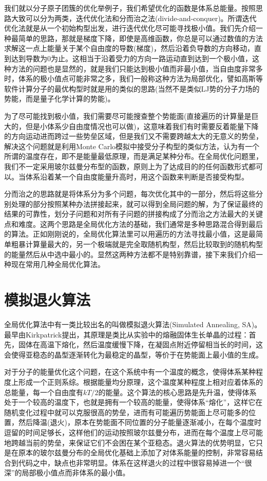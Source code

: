 \documentclass[12pt,a4paper,openany,twoside]{book}
\numberwithin{equation}{section}
\begin{document}
      我们就以分子原子团簇的优化举例子，我们希望优化的函数是体系总能量。按照思路大致可以分为两类，迭代优化法和分而治之法(divide-and-conquer)。所谓迭代优化法就是从一个初始构型出发，进行迭代优化尽可能寻找极小值。我们先介绍一种最简单的思路，那就是梯度下降，即使是高维函数，你总是可以通过数值的方法求解这一点上能量关于某个自由度的导数(梯度)，然后沿着负导数的方向移动，直到达到导数为0为止。这相当于沿着受力的方向一路运动直到达到一个极小值，这种方法的问题也是显然的，就是我们只能达到极小值而非最小值，当自由度非常多时，体系的极小值点可能非常之多，我们一般称这种方法为局部优化，譬如高斯等软件计算分子的最优构型时就是用的类似的思路(当然不是类似LJ势的分子力场的势能，而是量子化学计算的势能)。

      为了尽可能找到极小值，我们需要尽可能搜查整个势能面(直接遍历的计算量是巨大的，但是小体系少自由度情况也可以做)，这意味着我们有时需要反着能量下降的方向运动进而跨过一些势垒区域，但是我们又不需要跨越太大的无意义的势垒，解决这个问题就是利用Monte Carlo模拟中接受分子构型的类似方法，认为有一个所谓的温度存在，即不是能量最低原理，而是满足某种分布。在全局优化问题里，我们不一定采用玻尔兹曼分布型的函数，原则上为了达成目的的任何函数形式都可以。当体系沿着某一个自由度能量升高时，用这个函数来判断是否接受构型。

      分而治之的思路就是将体系分为多个问题，每次优化其中的一部分，然后将这些分别处理的部分按照某种办法拼接起来，就可以得到全局问题的解，为了保证最终的结果的可靠性，划分子问题和对所有子问题的拼接构成了分而治之方法最大的关键点和难度。这两个思路是全局优化方法的基础，我们通常是多种思路混合得到最后的算法。正如刚刚说的，全局优化算法里可以用遍历的方法寻找最小值，这是最简单粗暴计算量最大的，另一个极端就是完全取随机构型，然后比较取到的随机构型的能量然后从中选中最小的。显然这两种方法都不是特别靠谱，接下来我们介绍一种现在常用几种全局优化算法。
      
      \section{模拟退火算法}
        全局优化算法中有一类比较出名的叫做模拟退火算法(Simulated Annealing, SA)。最早由Kirkpatrick提出，其原理是类比从实验中的熔融固体生长单晶的过程：首先，固体在高温下熔化，然后温度缓慢下降，在凝固点附近停留相当长的时间，这会使得亚稳态的晶型逐渐转化为最稳定的晶型，等价于在势能面上最小值的生成。
        
        对于分子的能量优化这个问题，在这个系统中有一个温度的概念，使得体系某种程度上形成一个正则系综。根据能量均分原理，这个温度某种程度上相对应着体系的总能量，每一个自由度有$kT/2$的能量。这个算法的核心思路是先升温，使得体系处于一个较高的温度下，也就是拥有一个较高的能量，使得体系“熔化”，这样它在随机变化过程中就可以克服很高的势垒，进而有可能遍历势能面上尽可能多的位置，然后降温(退火)，原本在势能面不同位置的分子能量逐渐减小，在每个温度时逗留的时间足够长，这样他们的运动按照玻尔兹曼分布，进而在每个温度上尽可能地跨越当前的势垒，来保证它们不会困在某个亚稳态。退火算法的优势明显，它只是在原本的玻尔兹曼分布的全局优化基础上添加了对体系能量的控制，非常容易结合到代码之中，缺点也非常明显。体系在这样退火的过程中很容易掉进一个“很深”的局部极小值点而非体系的最小值。
\end{document}
